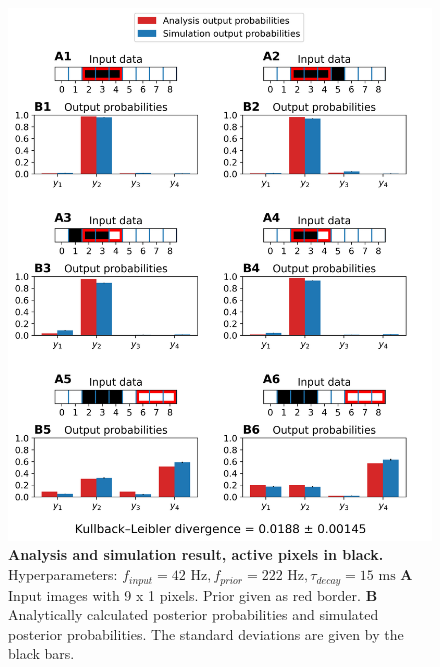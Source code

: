 \begin{figure}
  \includegraphics[width=\linewidth]{figures/1D/1D_42_222_15.png}
     \caption{\textbf{Analysis and simulation result, active pixels in black. } Hyperparameters: $f_{input} = 42\text{ Hz}, f_{prior} = 222\text{ Hz}, \tau_{decay} = 15\text{ ms}$ \textbf{A} Input images with 9 x 1 pixels. Prior given as red border. \textbf{B} Analytically calculated posterior probabilities and simulated posterior probabilities. The standard deviations are given by the black bars.}
  \label{fig:1D_42_222_15}
\end{figure}

